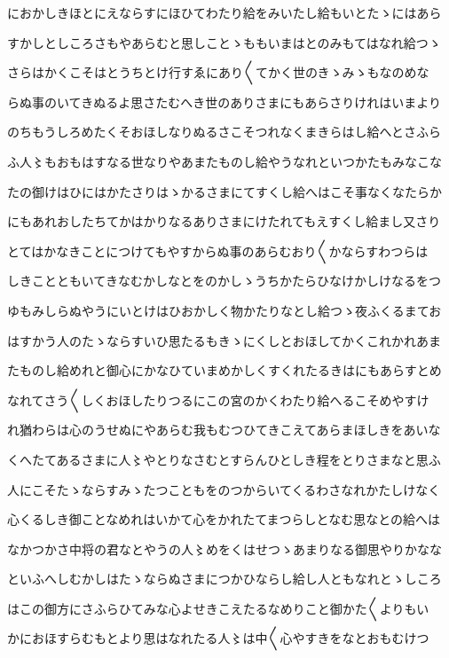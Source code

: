 \documentclass[a4paper,11pt,landscape]{ltjtarticle}
\begin{document}
におかしきほとにえならすにほひてわたり給をみいたし給もいとたゝにはあら
\par\medskip
すかしとしころさもやあらむと思しことゝももいまはとのみもてはなれ給つゝ
\par\medskip
さらはかくこそはとうちとけ行すゑにあり〱てかく世のきゝみゝもなのめな
\par\medskip
らぬ事のいてきぬるよ思さたむへき世のありさまにもあらさりけれはいまより
\par\medskip
のちもうしろめたくそおほしなりぬるさこそつれなくまきらはし給へとさふら
\par\medskip
ふ人〻もおもはすなる世なりやあまたものし給やうなれといつかたもみなこな
\par\medskip
たの御けはひにはかたさりはゝかるさまにてすくし給へはこそ事なくなたらか
\par\medskip
にもあれおしたちてかはかりなるありさまにけたれてもえすくし給まし又さり
\par\medskip
とてはかなきことにつけてもやすからぬ事のあらむおり〱かならすわつらは
\par\medskip
しきことともいてきなむかしなとをのかしゝうちかたらひなけかしけなるをつ
\par\medskip
ゆもみしらぬやうにいとけはひおかしく物かたりなとし給つゝ夜ふくるまてお
\par\medskip
はすかう人のたゝならすいひ思たるもきゝにくしとおほしてかくこれかれあま
\par\medskip
たものし給めれと御心にかなひていまめかしくすくれたるきはにもあらすとめ
\par\medskip
なれてさう〱しくおほしたりつるにこの宮のかくわたり給へるこそめやすけ
\par\medskip
れ猶わらは心のうせぬにやあらむ我もむつひてきこえてあらまほしきをあいな
\par\medskip
くへたてあるさまに人〻やとりなさむとすらんひとしき程をとりさまなと思ふ
\par\medskip
人にこそたゝならすみゝたつこともをのつからいてくるわさなれかたしけなく
\par\medskip
心くるしき御ことなめれはいかて心をかれたてまつらしとなむ思なとの給へは
\par\medskip
なかつかさ中将の君なとやうの人〻めをくはせつゝあまりなる御思やりかなな
\par\medskip
といふへしむかしはたゝならぬさまにつかひならし給し人ともなれとゝしころ
\par\medskip
はこの御方にさふらひてみな心よせきこえたるなめりこと御かた〱よりもい
\par\medskip
かにおほすらむもとより思はなれたる人〻は中〱心やすきをなとおもむけつ
\end{document}
